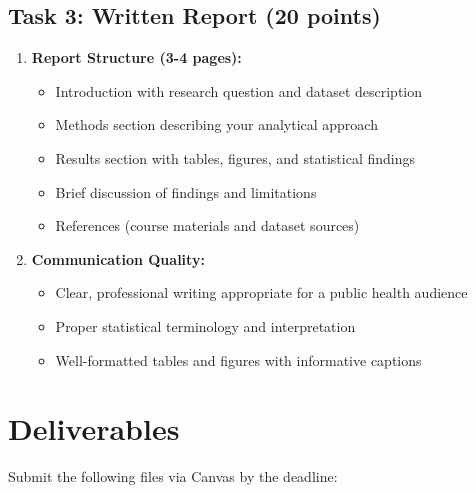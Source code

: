 \documentclass[11pt]{article}
\begin{document}
\subsection{Task 3: Written Report (20 points)}
\begin{enumerate}
\item \textbf{Report Structure (3-4 pages):}
   \begin{itemize}
   \item Introduction with research question and dataset description
   \item Methods section describing your analytical approach
   \item Results section with tables, figures, and statistical findings
   \item Brief discussion of findings and limitations
   \item References (course materials and dataset sources)
   \end{itemize}

\item \textbf{Communication Quality:}
   \begin{itemize}
   \item Clear, professional writing appropriate for a public health audience
   \item Proper statistical terminology and interpretation
   \item Well-formatted tables and figures with informative captions
   \end{itemize}
\end{enumerate}

\section{Deliverables}

Submit the following files via Canvas by the deadline:
\end{document}
